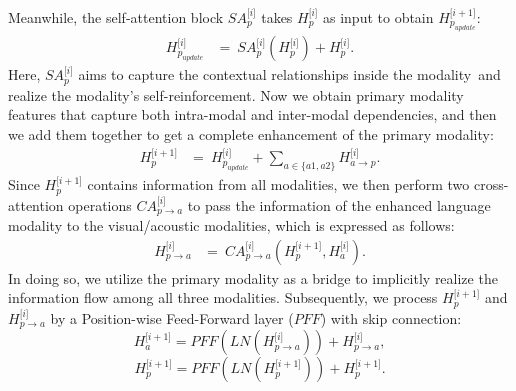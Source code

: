 \documentclass[letterpaper]{article} %
\begin{document}
Meanwhile, the self-attention block ${SA}_{p}^{\lbrack i\rbrack}$ takes $
H_{p}^{\lbrack i\rbrack}$ as input to obtain $H_{p_{update}}^{\lbrack{i + 1}\rbrack}$:
\begin{equation}
    \begin{aligned}
        H_{p_{update}}^{\lbrack{i}\rbrack} &= ~{SA}_{p}^{\lbrack i\rbrack}\left( H_{p}^{\lbrack i\rbrack} \right)+ H_{p}^{\lbrack i\rbrack}.
    \end{aligned}
\end{equation}
Here, ${SA}_{p}^{\lbrack i\rbrack}$ aims to capture the contextual relationships inside the modality and realize the modality's self-reinforcement. Now we obtain primary modality features that capture both intra-modal and inter-modal  dependencies, and then we add them together to get a complete enhancement of the primary modality:
\begin{equation}
    \begin{aligned}
        H_{p}^{\lbrack{i+1}\rbrack} &= ~H_{p_{update}}^{\lbrack i\rbrack}+ \sum\limits_{a \in \{ a1,a2\}}H_{a\rightarrow p}^{\lbrack i\rbrack}.
    \end{aligned}
\end{equation}
Since $H_{p}^{\lbrack{i+1}\rbrack}$ contains information from all modalities, we then perform two cross-attention operations ${CA}_{p\rightarrow a}^{\lbrack i\rbrack}$ to pass the information of the enhanced language modality to the visual/acoustic modalities,  which is expressed as follows:
\begin{equation}
       \begin{aligned}
           H_{p\rightarrow a}^{\lbrack i\rbrack} &= ~{CA}_{p\rightarrow a}^{\lbrack                i\rbrack}\left( {H_{p}^{\lbrack{i+1}\rbrack},H_{a}^{\lbrack                i\rbrack}} \right).
       \end{aligned}
\end{equation}
In doing so, we utilize the primary modality as a bridge to implicitly realize the information flow among all three modalities.
Subsequently, we process $H_{p}^{\lbrack{i + 1}\rbrack}$ and $H_{p\rightarrow a}^{\lbrack i\rbrack}$ by a Position-wise Feed-Forward layer ($PFF$) with skip connection:
\begin{equation}
    H_{a}^{\lbrack i+1\rbrack} = PFF\left( {LN\left( H_{p\rightarrow a}^{\lbrack i\rbrack} \right)} \right) + H_{p\rightarrow a}^{\lbrack i\rbrack},
\end{equation}
\begin{equation}
    H_{p}^{\lbrack{i + 1}\rbrack} = PFF\left( {LN\left( H_{p}^{\lbrack{i + 1}\rbrack} \right)} \right) + H_{p}^{\lbrack{i + 1}\rbrack}.
\end{equation}
\end{document}
